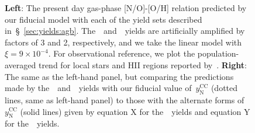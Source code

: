 \documentclass[ms.tex]{subfiles}
\begin{document}
\begin{figure}
\caption{
\textbf{Left}: The present day gas-phase [N/O]-[O/H] relation predicted by our 
fiducial model with each of the yield sets described 
in~\S~\ref{sec:yields:agb}. 
The~\cristallo~and~\ventura~yields are artificially amplified by factors of 
3 and 2, respectively, and we take the linear model with~$\xi = 9\times10^{-4}$. 
For observational reference, we plot the population-averaged trend for local 
stars and HII regions reported by~\citet{Dopita2016}. 
\textbf{Right}: The same as the left-hand panel, but comparing the predictions 
made by the~\karakasten~and~\karakas~yields with our fiducial value 
of~$y_\text{N}^\text{CC}$ (dotted lines, same as left-hand panel) to those with 
the alternate forms of~$y_\text{N}^\text{CC}$ (solid lines) given by equation X 
for the~\karakasten~yields and equation Y for the~\karakas~yields. 
} 
\label{fig:no_oh_predictions} 
\end{figure} 
\end{document}
